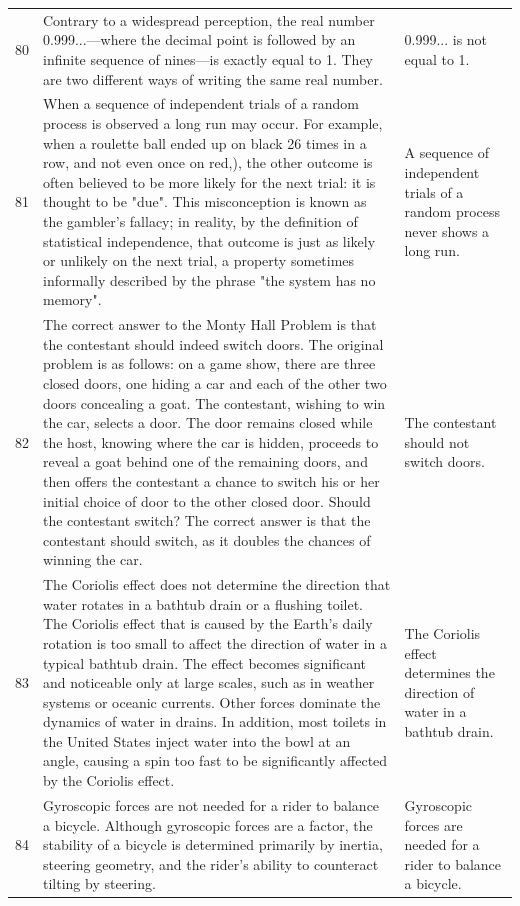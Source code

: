 \begin{tabular}{c|p{}|p{}}
80 & Contrary to a widespread perception, the real number 0.999...—where the decimal point is followed by an infinite sequence of nines—is exactly equal to 1. They are two different ways of writing the same real number. & 0.999... is not equal to 1. \\
81 & When a sequence of independent trials of a random process is observed a long run may occur. For example, when a roulette ball ended up on black 26 times in a row, and not even once on red,), the other outcome is often believed to be more likely for the next trial: it is thought to be "due". This misconception is known as the gambler's fallacy; in reality, by the definition of statistical independence, that outcome is just as likely or unlikely on the next trial, a property sometimes informally described by the phrase "the system has no memory". & A sequence of independent trials of a random process never shows a long run. \\
82 & The correct answer to the Monty Hall Problem is that the contestant should indeed switch doors. The original problem is as follows: on a game show, there are three closed doors, one hiding a car and each of the other two doors concealing a goat. The contestant, wishing to win the car, selects a door. The door remains closed while the host, knowing where the car is hidden, proceeds to reveal a goat behind one of the remaining doors, and then offers the contestant a chance to switch his or her initial choice of door to the other closed door. Should the contestant switch? The correct answer is that the contestant should switch, as it doubles the chances of winning the car. & The contestant should not switch doors. \\
83 & The Coriolis effect does not determine the direction that water rotates in a bathtub drain or a flushing toilet. The Coriolis effect that is caused by the Earth's daily rotation is too small to affect the direction of water in a typical bathtub drain. The effect becomes significant and noticeable only at large scales, such as in weather systems or oceanic currents. Other forces dominate the dynamics of water in drains. In addition, most toilets in the United States inject water into the bowl at an angle, causing a spin too fast to be significantly affected by the Coriolis effect. & The Coriolis effect determines the direction of water in a bathtub drain. \\
84 & Gyroscopic forces are not needed for a rider to balance a bicycle. Although gyroscopic forces are a factor, the stability of a bicycle is determined primarily by inertia, steering geometry, and the rider's ability to counteract tilting by steering. & Gyroscopic forces are needed for a rider to balance a bicycle. \\

\end{tabular}
